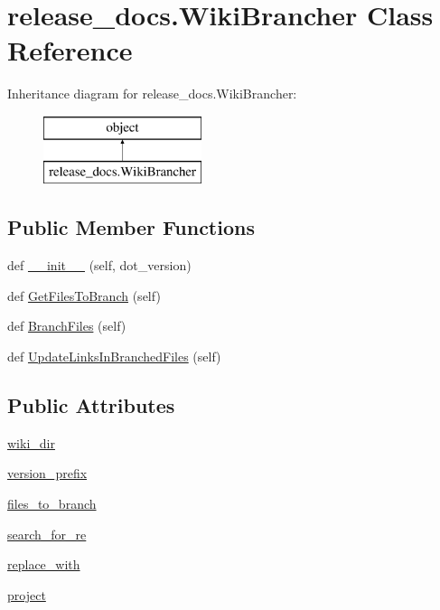 \hypertarget{classrelease__docs_1_1_wiki_brancher}{}\section{release\+\_\+docs.\+Wiki\+Brancher Class Reference}
\label{classrelease__docs_1_1_wiki_brancher}
Inheritance diagram for release\+\_\+docs.\+Wiki\+Brancher\+:\begin{figure}[H]
\begin{center}
\leavevmode
\includegraphics[height=2.000000cm]{dd/dd0/classrelease__docs_1_1_wiki_brancher}
\end{center}
\end{figure}
\subsection*{Public Member Functions}
\begin{DoxyCompactItemize}
\item 
def \mbox{\hyperlink{classrelease__docs_1_1_wiki_brancher_a344b32e2b65f0e8bab9fbf1e670d33fd}{\+\_\+\+\_\+init\+\_\+\+\_\+}} (self, dot\+\_\+version)
\item 
def \mbox{\hyperlink{classrelease__docs_1_1_wiki_brancher_a05fc4282f501fb0210ecb33fd1d209a6}{Get\+Files\+To\+Branch}} (self)
\item 
def \mbox{\hyperlink{classrelease__docs_1_1_wiki_brancher_a5ef284f7e1742f465ecd0c14d2667327}{Branch\+Files}} (self)
\item 
def \mbox{\hyperlink{classrelease__docs_1_1_wiki_brancher_aa0bc4b1b78426fe7a8496d570b540f1d}{Update\+Links\+In\+Branched\+Files}} (self)
\end{DoxyCompactItemize}
\subsection*{Public Attributes}
\begin{DoxyCompactItemize}
\item 
\mbox{\hyperlink{classrelease__docs_1_1_wiki_brancher_ad86478c9538ac0bf3916f67eb5da2910}{wiki\+\_\+dir}}
\item 
\mbox{\hyperlink{classrelease__docs_1_1_wiki_brancher_aae330aeef850b105795c5d75727448ba}{version\+\_\+prefix}}
\item 
\mbox{\hyperlink{classrelease__docs_1_1_wiki_brancher_a938c78ba6e8adfb6af039dd500ac6466}{files\+\_\+to\+\_\+branch}}
\item 
\mbox{\hyperlink{classrelease__docs_1_1_wiki_brancher_a029ce9007fefd6ac5f13bacdedb29af5}{search\+\_\+for\+\_\+re}}
\item 
\mbox{\hyperlink{classrelease__docs_1_1_wiki_brancher_aa33d991e629cc94fbfefe4f8569e283e}{replace\+\_\+with}}
\item 
\mbox{\hyperlink{classrelease__docs_1_1_wiki_brancher_a4ac9c796f95690cca04049b557055443}{project}}
\end{DoxyCompactItemize}



